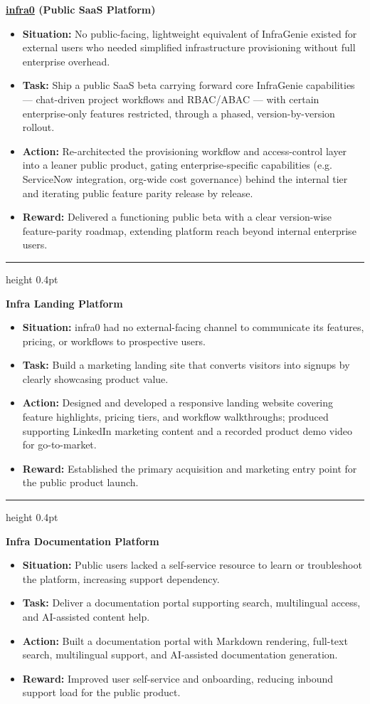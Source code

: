 \documentclass[a4paper,10pt]{article}
\newcommand{\projectdivider}{\vspace{4pt}\textcolor{dividercolor}{\hrule height 0.4pt}\vspace{4pt}}
\newcommand{\expblock}[1]{\noindent\textbf{#1}\par\vspace{1pt}}
\begin{document}
\expblock{\href{https://infra0.ai/}{infra0} (Public SaaS Platform)}
\begin{itemize}
\item \textbf{Situation:} No public-facing, lightweight equivalent of InfraGenie existed for external users who needed simplified infrastructure provisioning without full enterprise overhead.
\item \textbf{Task:} Ship a public SaaS beta carrying forward core InfraGenie capabilities — chat-driven project workflows and RBAC/ABAC — with certain enterprise-only features restricted, through a phased, version-by-version rollout.
\item \textbf{Action:} Re-architected the provisioning workflow and access-control layer into a leaner public product, gating enterprise-specific capabilities (e.g. ServiceNow integration, org-wide cost governance) behind the internal tier and iterating public feature parity release by release.
\item \textbf{Reward:} Delivered a functioning public beta with a clear version-wise feature-parity roadmap, extending platform reach beyond internal enterprise users.
\end{itemize}

\projectdivider

\expblock{Infra Landing Platform}
\begin{itemize}
\item \textbf{Situation:} infra0 had no external-facing channel to communicate its features, pricing, or workflows to prospective users.
\item \textbf{Task:} Build a marketing landing site that converts visitors into signups by clearly showcasing product value.
\item \textbf{Action:} Designed and developed a responsive landing website covering feature highlights, pricing tiers, and workflow walkthroughs; produced supporting LinkedIn marketing content and a recorded product demo video for go-to-market.
\item \textbf{Reward:} Established the primary acquisition and marketing entry point for the public product launch.
\end{itemize}

\projectdivider

\expblock{Infra Documentation Platform}
\begin{itemize}
\item \textbf{Situation:} Public users lacked a self-service resource to learn or troubleshoot the platform, increasing support dependency.
\item \textbf{Task:} Deliver a documentation portal supporting search, multilingual access, and AI-assisted content help.
\item \textbf{Action:} Built a documentation portal with Markdown rendering, full-text search, multilingual support, and AI-assisted documentation generation.
\item \textbf{Reward:} Improved user self-service and onboarding, reducing inbound support load for the public product.
\end{itemize}
\end{document}
